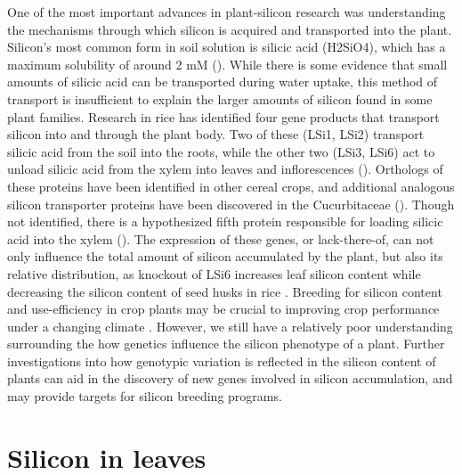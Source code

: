 \documentclass[12pt, letterpaper, ]{report}
\begin{document}
One of the most important advances in plant-silicon research was understanding the mechanisms through which silicon is acquired and transported into the plant. Silicon’s most common form in soil solution is silicic acid (H2SiO4), which has a maximum solubility of around 2 mM (\cite{haynes_contemporary_2014}). While there is some evidence that small amounts of silicic acid can be transported during water uptake, this method of transport is insufficient to explain the larger amounts of silicon found in some plant families. Research in rice has identified four gene products that transport silicon into and through the plant body. Two of these (LSi1, LSi2) transport silicic acid from the soil into the roots, while the other two (LSi3, LSi6) act to unload silicic acid from the xylem into leaves and inflorescences (\cite{yamaji_orchestration_2015}). Orthologs of these proteins have been identified in other cereal crops, and additional analogous silicon transporter proteins have been discovered in the Cucurbitaceae (\cite{reynolds_silicon_2016}). Though not identified, there is a hypothesized fifth protein responsible for loading silicic acid into the xylem (\cite{farooq_silicon_2015}). The expression of these genes, or lack-there-of, can not only influence the total amount of silicon accumulated by the plant, but also its relative distribution, as knockout of LSi6 increases leaf silicon content while decreasing the silicon content of seed husks in rice \cite{yamaji_transporter_2008}. Breeding for silicon content and use-efficiency in crop plants may be crucial to improving crop performance under a changing climate \cite{christian_breeding_2022}. However, we still have a relatively poor understanding surrounding the how genetics influence the silicon phenotype of a plant. Further investigations into how genotypic variation is reflected in the silicon content of plants can aid in the discovery of new genes involved in silicon accumulation, and may provide targets for silicon breeding programs. 

\section{Silicon in leaves}	
\end{document}
